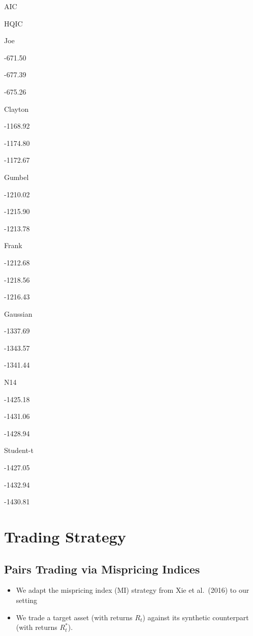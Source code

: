 \documentclass[
  letterpaper,
  DIV=11,
  numbers=noendperiod]{scrartcl}
\providecommand{\tightlist}{%
  \setlength{\itemsep}{0pt}\setlength{\parskip}{0pt}}\usepackage{longtable,booktabs,array}
\begin{document}
AIC

HQIC

Joe

-671.50

-677.39

-675.26

Clayton

-1168.92

-1174.80

-1172.67

Gumbel

-1210.02

-1215.90

-1213.78

Frank

-1212.68

-1218.56

-1216.43

Gaussian

-1337.69

-1343.57

-1341.44

N14

-1425.18

-1431.06

-1428.94

Student-t

-1427.05

-1432.94

-1430.81

\section{Trading Strategy}\label{trading-strategy}

\subsection{Pairs Trading via Mispricing
Indices}\label{pairs-trading-via-mispricing-indices}

\begin{itemize}
\tightlist
\item
  We adapt the mispricing index (MI) strategy from Xie et al.~(2016) to
  our setting
\end{itemize}

\begin{itemize}
\tightlist
\item
  We trade a target asset (with returns \(R_t\)) against its synthetic
  counterpart (with returns \(R_t^*\)).
\end{itemize}
\end{document}
